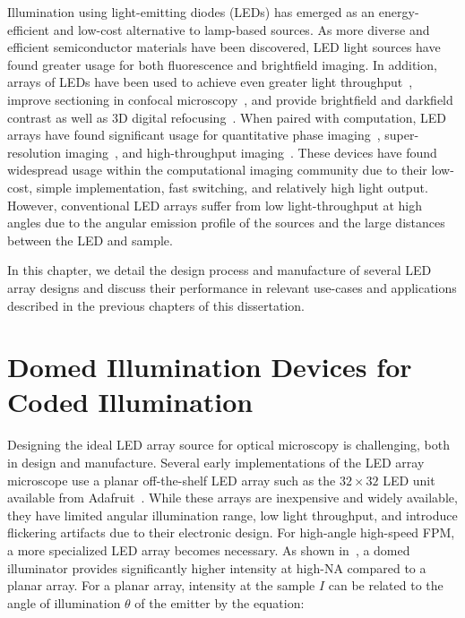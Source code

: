 Illumination using light-emitting diodes (LEDs) has emerged as an energy-efficient and low-cost alternative to lamp-based sources. As more diverse and efficient semiconductor materials have been discovered, LED light sources have found greater usage for both fluorescence and brightfield imaging. In addition, arrays of LEDs have been used to achieve even greater light throughput~\cite{albeanu2008led}, improve sectioning in confocal microscopy~\cite{poher2007optical}, and provide brightfield and darkfield contrast as well as 3D digital refocusing~\cite{Zheng2011}. When paired with computation, LED arrays have found significant usage for quantitative phase imaging~\cite{tian2015quantitative, phillips2015multi, chen2018quantitative}, super-resolution imaging~\cite{Zheng2013, Tian2014}, and high-throughput imaging~\cite{Ma:15}. These devices have found widespread usage within the computational imaging community due to their low-cost, simple implementation, fast switching, and relatively high light output. However, conventional LED arrays suffer from low light-throughput at high angles due to the angular emission profile of the sources and the large distances between the LED and sample.

In this chapter, we detail the design process and manufacture of several LED array designs and discuss their performance in relevant use-cases and applications described in the previous chapters of this dissertation.

\section{Domed Illumination Devices for Coded Illumination}

Designing the ideal LED array source for optical microscopy is challenging, both in design and manufacture. Several early implementations of the LED array microscope use a planar off-the-shelf LED array such as the $32\times 32$ LED unit available from Adafruit~\cite{Zheng2013, Zheng2011}. While these arrays are inexpensive and widely available, they have limited angular illumination range, low light throughput, and introduce flickering artifacts due to their electronic design. For high-angle high-speed FPM, a more specialized LED array becomes necessary. As shown in~\cite{phillips2015multi, Dominguez:14}, a domed illuminator provides significantly higher intensity at high-NA compared to a planar array. For a planar array, intensity at the sample $I$ can be related to the angle of illumination $\theta$ of the emitter by the equation:

